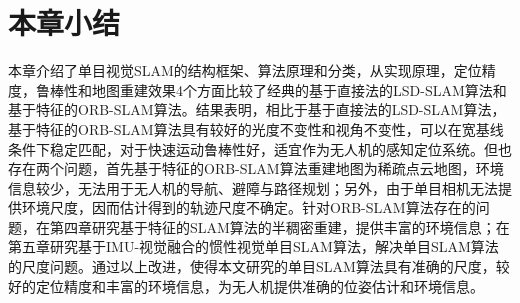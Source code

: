 \section{本章小结}
本章介绍了单目视觉SLAM的结构框架、算法原理和分类，从实现原理，定位精度，鲁棒性和地图重建效果4个方面比较了经典的基于直接法的LSD-SLAM算法和基于特征的ORB-SLAM算法。结果表明，相比于基于直接法的LSD-SLAM算法，基于特征的ORB-SLAM算法具有较好的光度不变性和视角不变性，可以在宽基线条件下稳定匹配，对于快速运动鲁棒性好，适宜作为无人机的感知定位系统。但也存在两个问题，首先基于特征的ORB-SLAM算法重建地图为稀疏点云地图，环境信息较少，无法用于无人机的导航、避障与路径规划；另外，由于单目相机无法提供环境尺度，因而估计得到的轨迹尺度不确定。针对ORB-SLAM算法存在的问题，在第四章研究基于特征的SLAM算法的半稠密重建，提供丰富的环境信息；在第五章研究基于IMU-视觉融合的惯性视觉单目SLAM算法，解决单目SLAM算法的尺度问题。通过以上改进，使得本文研究的单目SLAM算法具有准确的尺度，较好的定位精度和丰富的环境信息，为无人机提供准确的位姿估计和环境信息。




